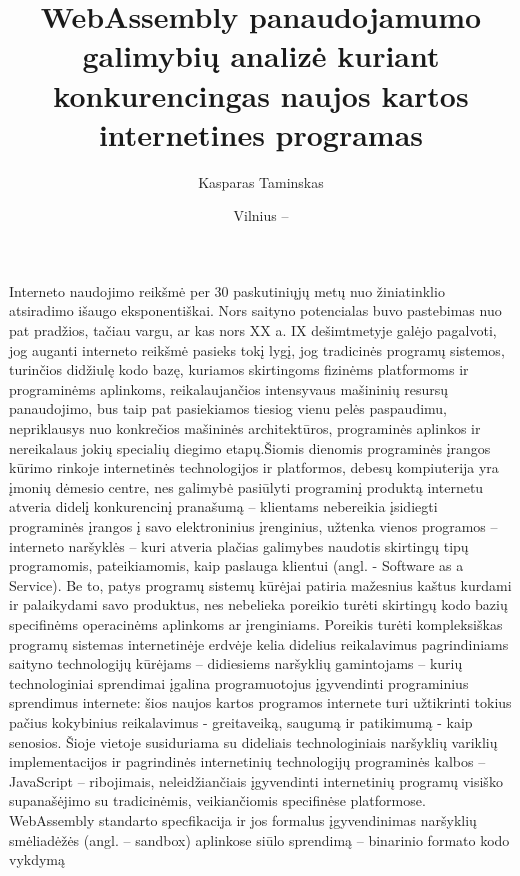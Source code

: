 \documentclass{VUMIFPSkursinis}
\title{WebAssembly panaudojamumo galimybių analizė kuriant konkurencingas naujos kartos internetines programas }
\author{Kasparas Taminskas}
\date{Vilnius – \the\year}
\begin{document}
	
\maketitle
\cleardoublepage{}
\setcounter{page}{2}

\tableofcontents

Interneto naudojimo reikšmė per 30 paskutiniųjų metų nuo žiniatinklio atsiradimo išaugo 
eksponentiškai. Nors saityno potencialas buvo pastebimas nuo pat pradžios, tačiau vargu, ar 
kas nors XX a. IX dešimtmetyje galėjo pagalvoti, jog auganti interneto reikšmė pasieks tokį 
lygį, jog tradicinės programų sistemos, turinčios didžiulę kodo bazę, kuriamos skirtingoms 
fizinėms platformoms ir programinėms aplinkoms, reikalaujančios intensyvaus mašininių resursų 
panaudojimo, bus taip pat pasiekiamos tiesiog vienu pelės paspaudimu, nepriklausys nuo 
konkrečios mašininės architektūros, programinės aplinkos ir nereikalaus jokių specialių 
diegimo etapų.Šiomis dienomis programinės įrangos kūrimo rinkoje internetinės technologijos ir 
platformos, debesų kompiuterija yra įmonių dėmesio centre, nes galimybė pasiūlyti programinį 
produktą internetu atveria didelį konkurencinį pranašumą – klientams nebereikia įsidiegti 
programinės įrangos į savo elektroninius įrenginius, užtenka vienos programos – interneto 
naršyklės – kuri atveria plačias galimybes naudotis skirtingų tipų programomis, pateikiamomis, 
kaip paslauga klientui (angl. - Software as a Service). Be to, patys programų sistemų kūrėjai 
patiria mažesnius kaštus kurdami ir palaikydami savo produktus, nes nebelieka poreikio turėti 
skirtingų kodo bazių specifinėms operacinėms aplinkoms ar įrenginiams.
Poreikis turėti kompleksiškas programų sistemas internetinėje erdvėje kelia didelius 
reikalavimus pagrindiniams saityno technologijų kūrėjams – didiesiems naršyklių gamintojams – 
kurių technologiniai sprendimai įgalina programuotojus įgyvendinti programinius sprendimus 
internete: šios naujos kartos programos internete turi užtikrinti tokius pačius kokybinius 
reikalavimus - greitaveiką, saugumą ir patikimumą - kaip senosios. Šioje vietoje susiduriama 
su dideliais technologiniais naršyklių variklių implementacijos ir pagrindinės internetinių 
technologijų programinės kalbos – JavaScript – ribojimais, neleidžiančiais įgyvendinti 
internetinių programų visiško supanašėjimo su tradicinėmis, veikiančiomis specifinėse 
platformose. WebAssembly standarto specfikacija ir jos formalus įgyvendinimas naršyklių 
smėliadėžės (angl. – sandbox) aplinkose siūlo sprendimą – binarinio formato kodo vykdymą 
\end{document}
